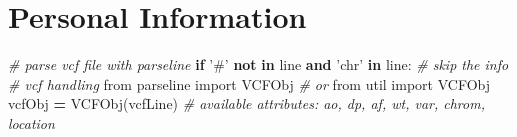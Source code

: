 \documentclass[]{book}
\newenvironment{Shaded}{\begin{snugshade}}{\end{snugshade}}
\newcommand{\CharTok}[1]{\textcolor[rgb]{0.31,0.60,0.02}{#1}}
\newcommand{\CommentTok}[1]{\textcolor[rgb]{0.56,0.35,0.01}{\textit{#1}}}
\newcommand{\ControlFlowTok}[1]{\textcolor[rgb]{0.13,0.29,0.53}{\textbf{#1}}}
\newcommand{\ImportTok}[1]{#1}
\newcommand{\KeywordTok}[1]{\textcolor[rgb]{0.13,0.29,0.53}{\textbf{#1}}}
\newcommand{\NormalTok}[1]{#1}
\newcommand{\OperatorTok}[1]{\textcolor[rgb]{0.81,0.36,0.00}{\textbf{#1}}}
\newcommand{\SpecialCharTok}[1]{\textcolor[rgb]{0.00,0.00,0.00}{#1}}
\newcommand{\StringTok}[1]{\textcolor[rgb]{0.31,0.60,0.02}{#1}}
\newcommand{\VariableTok}[1]{\textcolor[rgb]{0.00,0.00,0.00}{#1}}
\begin{document}
\begin{Shaded}
\end{Shaded}

\hypertarget{personal-information}{%
\section{Personal Information}\label{personal-information}}

\begin{Shaded}
\begin{Highlighting}[]
\CommentTok{# parse vcf file with parseline}
\ControlFlowTok{if} \StringTok{'#'} \KeywordTok{not} \KeywordTok{in}\NormalTok{ line }\KeywordTok{and} \StringTok{'chr'} \KeywordTok{in}\NormalTok{ line: }\CommentTok{# skip the info}
\CommentTok{# vcf handling}
\ImportTok{from}\NormalTok{ parseline }\ImportTok{import}\NormalTok{ VCFObj}
\CommentTok{# or}
\ImportTok{from}\NormalTok{ util }\ImportTok{import}\NormalTok{ VCFObj}
\NormalTok{vcfObj }\OperatorTok{=}\NormalTok{ VCFObj(vcfLine)}
\CommentTok{# available attributes: ao, dp, af, wt, var, chrom, location}
\end{Highlighting}
\end{Shaded}
\end{document}
